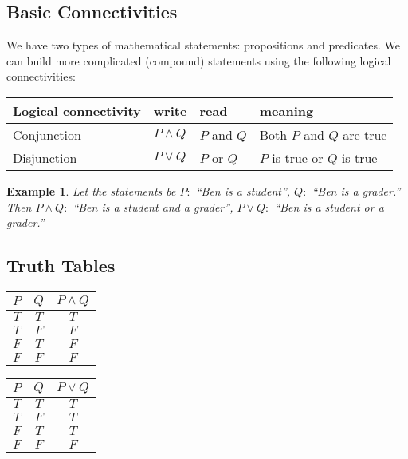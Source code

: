 \documentclass[10pt,reqno]{book}
\theoremstyle{plain}
\newtheorem{example}{Example}
\begin{document}
	\subsection*{Basic Connectivities}
	
	We have two types of mathematical statements: propositions and predicates. We can build more complicated (compound) statements using the following logical connectivities:
	\begin{center}
		\begin{tabular}{|l|l|l|l|}
			\hline
			Logical connectivity & write          & read            & meaning                        \\ \hline
			Conjunction          & $ P \wedge Q $ & $ P $ and $ Q $ & Both $ P $ and $ Q $ are true  \\ \hline
			Disjunction          & $ P \vee Q $   & $ P $ or $ Q $  & $ P $ is true or $ Q $ is true \\ \hline
		\end{tabular}
	\end{center}

	\begin{example}
		Let the statements be $ P: $ ``Ben is a student'', $ Q: $ ``Ben is a grader.'' Then $ P \wedge Q:$ ``Ben is a student and a grader'', $ P \vee Q:$ ``Ben is a student or a grader.''
	\end{example}
	
	\subsection*{Truth Tables}
	
	\begin{center}
		\begin{tabular}{|c|c|c|}
			\hline
			$ P $ & $ Q $ & $ P \wedge Q $ \\ \hline
			$ T $ & $ T $ &     $ T $      \\ \hline
			$ T $ & $ F $ &     $ F $      \\ \hline
			$ F $ & $ T $ &     $ F $      \\ \hline
			$ F $ & $ F $ &     $ F $      \\ \hline
		\end{tabular} \hspace{1cm}
		\begin{tabular}{|c|c|c|}
			\hline
			$ P $ & $ Q $ & $ P \vee Q $ \\ \hline
			$ T $ & $ T $ &     $ T $      \\ \hline
			$ T $ & $ F $ &     $ T $      \\ \hline
			$ F $ & $ T $ &     $ T $      \\ \hline
			$ F $ & $ F $ &     $ F $      \\ \hline
		\end{tabular}
	\end{center}
	
\end{document}

